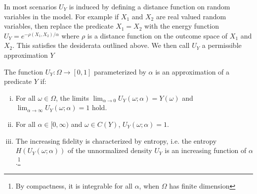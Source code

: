
In most scenarios $U_Y$ is induced by defining a distance function on random variables in the model. 
For example if $X_1$ and $X_2$ are real valued random variables, then replace the predicate $X_1 = X_2$ with the energy function $U_Y = e^{-\rho(X_1, X_2) / \alpha}$ where $\rho$ is a distance function on the outcome space of $X_1$ and $X_2$.
This satisfies the desiderata outlined above.  We then call $U_Y$ a permissible approximation $Y$

\begin{definition}
The function $U_Y : \Omega \to [0, 1]$ parameterized by $\alpha$ is an approximation of a predicate $Y$ if:
\begin{enumerate}[(i)]\label{def:temp}
	\item For all $\omega \in \Omega$, the limits $\lim_{\alpha \to 0}U_Y(\omega; \alpha) = Y(\omega)$ and $\lim_{\alpha \to \infty}U_Y(\omega; \alpha) = 1$ hold.
    \item For all $\alpha \in [0, \infty)$ and  $\omega \in C(Y)$, $U_Y(\omega; \alpha) = 1$.
    \item The increasing fidelity is characterized by entropy, i.e. the entropy $H(U_Y(\omega; \alpha))$ of the unnormalized density $U_Y$ is an increasing function of $\alpha$.\footnote
    {By compactness, it is integrable for all $\alpha$, when $\Omega$ has finite dimension}
\end{enumerate}
\end{definition}

